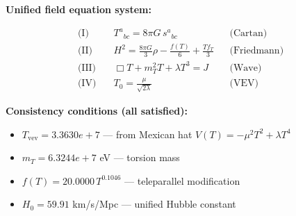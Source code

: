 
\textbf{Unified field equation system:}

\begin{align}
  \text{(I)} \quad & T^a{}_{bc} = 8\pi G \, s^a{}_{bc} && \text{(Cartan)} \\
  \text{(II)} \quad & H^2 = \frac{8\pi G}{3}\rho - \frac{f(T)}{6} + \frac{Tf_T}{3} && \text{(Friedmann)} \\
  \text{(III)} \quad & \Box T + m_T^2 T + \lambda T^3 = J && \text{(Wave)} \\
  \text{(IV)} \quad & T_0 = \frac{\mu}{\sqrt{2\lambda}} && \text{(VEV)}
\end{align}

\textbf{Consistency conditions (all satisfied):}
\begin{itemize}
  \item $T_{\text{vev}} = 3.3630e+7$ — from Mexican hat $V(T) = -\mu^2 T^2 + \lambda T^4$
  \item $m_T = 6.3244e+7$ eV — torsion mass
  \item $f(T) = 20.0000 \, T^{0.1046}$ — teleparallel modification
  \item $H_0 = 59.91$ km/s/Mpc — unified Hubble constant
\end{itemize}